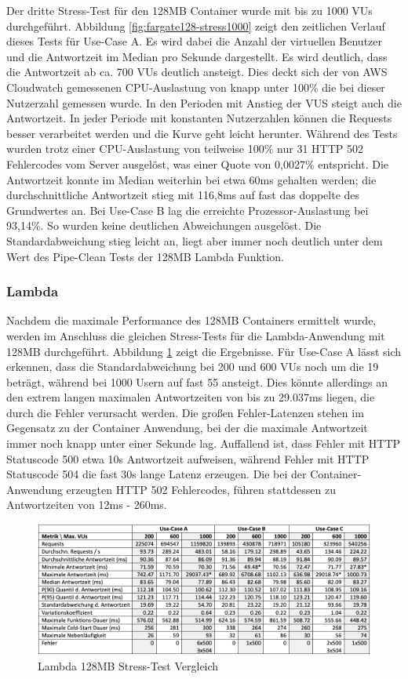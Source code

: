 Der dritte Stress-Test für den 128MB Container wurde mit bis zu 1000 VUs durchgeführt. Abbildung \ref{fig:fargate128-stress1000} zeigt den zeitlichen Verlauf dieses Tests für Use-Case A. Es wird dabei die Anzahl der virtuellen Benutzer und die Antwortzeit im Median pro Sekunde dargestellt. Es wird deutlich, dass die Antwortzeit ab ca. 700 VUs deutlich ansteigt. Dies deckt sich der von AWS Cloudwatch gemessenen CPU-Auslastung von knapp unter 100\% die bei dieser Nutzerzahl gemessen wurde. In den Perioden mit Anstieg der VUS steigt auch die Antwortzeit. In jeder Periode mit konstanten Nutzerzahlen können die Requests besser verarbeitet werden und die Kurve geht leicht herunter. Während des Tests wurden trotz einer CPU-Auslastung von teilweise 100\% nur 31 HTTP 502 Fehlercodes vom Server ausgelöst, was einer Quote von 0,0027\% entspricht. Die Antwortzeit konnte im Median weiterhin bei etwa 60ms gehalten werden; die durchschnittliche Antwortzeit stieg mit 116,8ms auf fast das doppelte des Grundwertes an.  
Bei Use-Case B lag die erreichte Prozessor-Auslastung bei 93,14\%. So wurden keine deutlichen Abweichungen ausgelöst. Die Standardabweichung stieg leicht an, liegt aber immer noch deutlich unter dem Wert des Pipe-Clean Tests der 128MB Lambda Funktion.

\subsubsection{Lambda}
Nachdem die maximale Performance des 128MB Containers ermittelt wurde, werden im Anschluss die gleichen Stress-Tests für die Lambda-Anwendung mit 128MB durchgeführt. Abbildung \ref{fig:lambda128-stress-comparison} zeigt die Ergebnisse. Für Use-Case A lässt sich erkennen, dass die Standardabweichung bei 200 und 600 VUs noch um die 19 beträgt, während bei 1000 Usern auf fast 55 ansteigt. Dies könnte allerdings an den extrem langen maximalen Antwortzeiten von bis zu 29.037ms liegen, die durch die Fehler verursacht werden. Die großen Fehler-Latenzen stehen im Gegensatz zu der Container Anwendung, bei der die maximale Antwortzeit immer noch knapp unter einer Sekunde lag. Auffallend ist, dass Fehler mit HTTP Statuscode 500 etwa 10s Antwortzeit aufweisen, während Fehler mit HTTP Statuscode 504 die fast 30s lange Latenz erzeugen. Die bei der Container-Anwendung erzeugten HTTP 502 Fehlercodes, führen stattdessen zu  Antwortzeiten von 12ms - 260ms. 

\begin{figure}[H]
    \includegraphics[width=\textwidth]{img/lambda128-stress-comparison.png}
    \caption[Lambda 128MB Stress-Test Vergleich]{Lambda 128MB Stress-Test Vergleich}
    \label{fig:lambda128-stress-comparison}
\end{figure}

